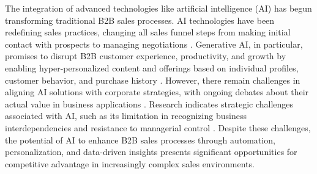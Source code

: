 The integration of advanced technologies like artificial intelligence (AI) has begun transforming traditional B2B sales processes. AI technologies have been redefining sales practices, changing all sales funnel steps from making initial contact with prospects to managing negotiations \cite{paschen2020collaborative}. Generative AI, in particular, promises to disrupt B2B customer experience, productivity, and growth by enabling hyper-personalized content and offerings based on individual profiles, customer behavior, and purchase history \cite{deveau2023ai}. However, there remain challenges in aligning AI solutions with corporate strategies, with ongoing debates about their actual value in business applications \cite{forsell2024competitive}. Research indicates strategic challenges associated with AI, such as its limitation in recognizing business interdependencies and resistance to managerial control \cite{kemp2023competitive}. Despite these challenges, the potential of AI to enhance B2B sales processes through automation, personalization, and data-driven insights presents significant opportunities for competitive advantage in increasingly complex sales environments.
